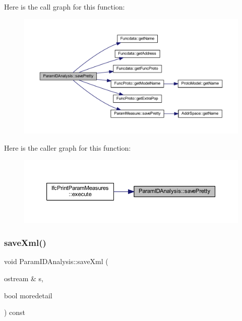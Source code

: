 Here is the call graph for this function\+:
\nopagebreak
\begin{figure}[H]
\begin{center}
\leavevmode
\includegraphics[width=350pt]{class_param_i_d_analysis_a188bdfa79597d13c285a1ff51976ce36_cgraph}
\end{center}
\end{figure}
Here is the caller graph for this function\+:
\nopagebreak
\begin{figure}[H]
\begin{center}
\leavevmode
\includegraphics[width=350pt]{class_param_i_d_analysis_a188bdfa79597d13c285a1ff51976ce36_icgraph}
\end{center}
\end{figure}
\mbox{\label{class_param_i_d_analysis_a50452520f5707bb1440ad9a88ab278cc}} 
\subsubsection{\texorpdfstring{saveXml()}{saveXml()}}
{\footnotesize\ttfamily void Param\+I\+D\+Analysis\+::save\+Xml (\begin{DoxyParamCaption}\item[{ostream \&}]{s,  }\item[{bool}]{moredetail }\end{DoxyParamCaption}) const}



